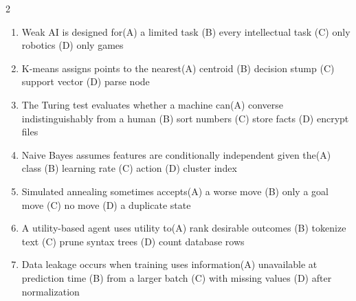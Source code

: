 \documentclass[a4paper]{article}
\begin{document}
\begin{multicols*}{2}
\begin{enumerate}
\item Weak AI is designed for\newline\hspace*{0.6em}(A) a limited task \quad (B) every intellectual task \newline\hspace*{0.6em}(C) only robotics \quad (D) only games
\item K-means assigns points to the nearest\newline\hspace*{0.6em}(A) centroid \quad (B) decision stump \newline\hspace*{0.6em}(C) support vector \quad (D) parse node
\item The Turing test evaluates whether a machine can\newline\hspace*{0.6em}(A) converse indistinguishably from a human \quad (B) sort numbers \newline\hspace*{0.6em}(C) store facts \quad (D) encrypt files
\item Naive Bayes assumes features are conditionally independent given the\newline\hspace*{0.6em}(A) class \quad (B) learning rate \newline\hspace*{0.6em}(C) action \quad (D) cluster index
\item Simulated annealing sometimes accepts\newline\hspace*{0.6em}(A) a worse move \quad (B) only a goal move \newline\hspace*{0.6em}(C) no move \quad (D) a duplicate state
\item A utility-based agent uses utility to\newline\hspace*{0.6em}(A) rank desirable outcomes \quad (B) tokenize text \newline\hspace*{0.6em}(C) prune syntax trees \quad (D) count database rows
\item Data leakage occurs when training uses information\newline\hspace*{0.6em}(A) unavailable at prediction time \quad (B) from a larger batch \newline\hspace*{0.6em}(C) with missing values \quad (D) after normalization

\end{enumerate}
\end{multicols*}
\end{document}
